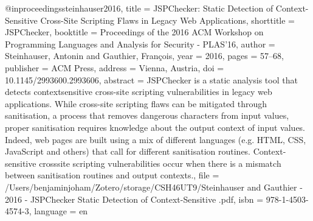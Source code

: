@inproceedings{steinhauser2016,
  title = {{{JSPChecker}}: {{Static Detection}} of {{Context}}-{{Sensitive Cross}}-{{Site Scripting Flaws}} in {{Legacy Web Applications}}},
  shorttitle = {{{JSPChecker}}},
  booktitle = {Proceedings of the 2016 {{ACM Workshop}} on {{Programming Languages}} and {{Analysis}} for {{Security}} - {{PLAS}}'16},
  author = {Steinhauser, Antonin and Gauthier, Fran{\c c}ois},
  year = {2016},
  pages = {57--68},
  publisher = {{ACM Press}},
  address = {{Vienna, Austria}},
  doi = {10.1145/2993600.2993606},
  abstract = {JSPChecker is a static analysis tool that detects contextsensitive cross-site scripting vulnerabilities in legacy web applications. While cross-site scripting flaws can be mitigated through sanitisation, a process that removes dangerous characters from input values, proper sanitisation requires knowledge about the output context of input values. Indeed, web pages are built using a mix of different languages (e.g. HTML, CSS, JavaScript and others) that call for different sanitisation routines. Context-sensitive crosssite scripting vulnerabilities occur when there is a mismatch between sanitisation routines and output contexts.},
  file = {/Users/benjaminjoham/Zotero/storage/CSH46UT9/Steinhauser and Gauthier - 2016 - JSPChecker Static Detection of Context-Sensitive .pdf},
  isbn = {978-1-4503-4574-3},
  language = {en}
}

